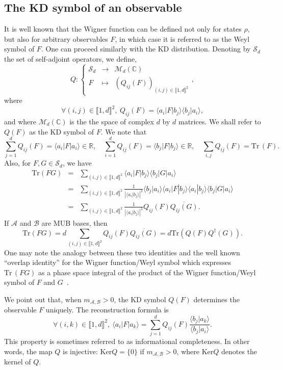 \documentclass[a4paper, notitlepage, 11pt]{article}
\numberwithin{equation}{section}
\newcommand{\bra}[1]{\langle #1|}
\newcommand{\cket}[1]{|#1\rangle}
\newcommand{\bracket}[2]{\langle #1|#2\rangle}
\newcommand{\mcl}[1]{\mathcal{#1}}
\newcommand{\Acal}{{\mathcal A}}
\newcommand{\Bcal}{{\mathcal B}}
\newcommand{\Ker}{{\mathrm{Ker}}}
\newcommand{\R}{\mathbb{R}}
\newcommand{\C}{\mathbb{C}}
\newcommand{\mab}{m_{\Acal,\Bcal}}
\newcommand{\Tr}{\mathrm{Tr}\,}
\newcommand{\SAO}{\mathcal{S}_{d}}
\newcommand{\MatC}[1]{\mcl{M}_{#1}(\C)}
\newcommand{\IntEnt}[2]{\llbracket #1 , #2 \rrbracket}
\begin{document}
 \subsection{The KD symbol of an observable}
 It is well known that the Wigner function can be defined not only for states $\rho$, but also for arbitrary observables $F$, in which case it is referred to as the Weyl symbol of $F$. One can proceed similarly {with} the KD distribution.  
 Denoting by $\SAO$ the set of self-adjoint operators,  we define, 
 \begin{equation} \label{eq:Qdef}
Q : \left\{\begin{array}{rcl}
\SAO  & \rightarrow &\MatC{d} \\
 F & \mapsto & (Q_{ij}( F))_{(i,j)\in\IntEnt{1}{d}^2}
\end{array}\right.,
\end{equation}
where
\[
\forall (i,j)\in\IntEnt{1}{d}^2, \  Q_{ij}(F)=\langle a_i|F|b_j\rangle \langle b_j|a_i\rangle ,
\]
and where $\MatC{d}$ is the the space of {complex} $d$ by $d$  matrices.
We shall refer to $Q(F)$ as the KD symbol of $F$. 
We note that
\begin{equation}\label{eq:Qmarginals}
\sum_{j=1}^{d} Q_{ij}(F)=\langle a_i|F|a_i\rangle\in\R, \quad \sum_{i=1}^{d} Q_{ij}(F)=\langle b_j|F|b_j\rangle\in\R, \quad \sum_{i,j}Q_{ij}(F)=\Tr (F).
\end{equation}
Also, for $F,G\in\SAO$, we have 
\[
\begin{array}{rcl}
\mathrm{Tr}(FG) &=&  \sum_{(i,j)\in\IntEnt{1}{d}^2} \bra{a_i}F\cket{b_j}\bra{b_j}G\cket{a_i} \\
&=& \displaystyle\sum_{(i,j)\in\IntEnt{1}{d}^2} \frac{1}{\left|\bracket{a_i}{b_j}\right|^2}\bracket{b_j}{a_i}\bra{a_i}F\cket{b_j}\bracket{a_i}{b_j}\bra{b_j}G\cket{a_i} \\
&=&\displaystyle \sum_{(i,j)\in\IntEnt{1}{d}^2}\frac{1}{\left|\bracket{a_i}{b_j}\right|^2}Q_{ij}(F)\overline{Q_{ij}(G)}.
\end{array}\]
If $\Acal$ and $\Bcal$ are MUB bases, then
\[
\mathrm{Tr}(FG) = d\sum_{(i,j)\in\IntEnt{1}{d}^2}Q_{ij}(F)\overline{Q_{ij}(G)}=d \mathrm{Tr}(Q(F)Q^{\dagger}(G)).
\]
One may note the analogy between these two identities and the well known ``overlap identity'' for the Wigner function/Weyl symbol which expresses $\Tr(FG)$ as a phase space integral of the product of the Wigner function/Weyl symbol of $F$ and $G$~\cite{leonhardt2010}.

We point out that, when $\mab>0$, the KD symbol $Q(F)$ determines the observable $F$ uniquely. The reconstruction formula is~\cite{johansen2007}
\begin{equation}\label{eq:infcomplete}
\forall (i,k)\in\IntEnt{1}{d}^2, \ \langle a_i|F|a_k\rangle = \sum_{j=1}^{d} Q_{ij}(F)\frac{\langle b_j|a_k\rangle}{\langle b_j|a_i\rangle}.
\end{equation}
This property is sometimes referred to as informational completeness. 
In other words, the map $Q$ is injective: $\Ker Q=\{0\}$ if $\mab>0${, where $\Ker Q$ denotes the kernel of $Q$.}
\end{document}
